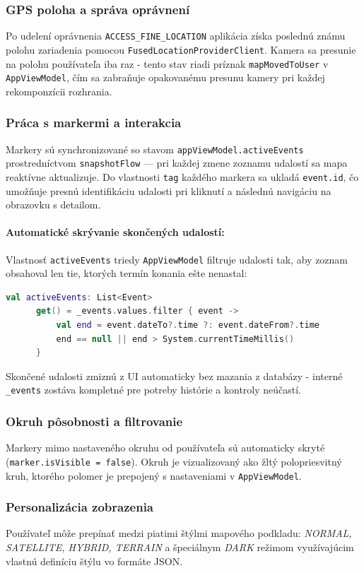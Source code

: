   \subsubsection{GPS poloha a správa oprávnení}
  Po udelení oprávnenia \texttt{ACCESS\_FINE\_LOCATION} aplikácia získa poslednú
  známu polohu zariadenia pomocou \texttt{FusedLocationProviderClient}. Kamera
  sa presunie na polohu používateľa iba raz - tento stav riadi príznak
  \texttt{mapMovedToUser} v \texttt{AppViewModel}, čím sa zabraňuje opakovanému
  presunu kamery pri každej rekomponzícii rozhrania.

  \subsubsection{Práca s markermi a interakcia}
  Markery sú synchronizované so stavom \texttt{appViewModel.activeEvents}
  prostredníctvom \texttt{snapshotFlow} — pri každej zmene zoznamu udalostí
  sa mapa reaktívne aktualizuje. Do vlastnosti \texttt{tag} každého markera
  sa ukladá \texttt{event.id}, čo umožňuje presnú identifikáciu udalosti
  pri kliknutí a následnú navigáciu na obrazovku s detailom.

  \paragraph{Automatické skrývanie skončených udalostí:}
  Vlastnosť \texttt{activeEvents} triedy \texttt{AppViewModel} filtruje udalosti
  tak, aby zoznam obsahoval len tie, ktorých termín konania ešte nenastal:

  \begin{lstlisting}[language=Kotlin, caption=Computed property activeEvents v AppViewModel]
  val activeEvents: List<Event>
      get() = _events.values.filter { event ->
          val end = event.dateTo?.time ?: event.dateFrom?.time
          end == null || end > System.currentTimeMillis()
      }
  \end{lstlisting}

  Skončené udalosti zmiznú z UI
  automaticky bez mazania z databázy - interné \texttt{\_events} zostáva
  kompletné pre potreby histórie a kontroly neúčastí.

  \subsubsection{Okruh pôsobnosti a filtrovanie}
  Markery mimo nastaveného okruhu od používateľa sú automaticky skryté
  (\texttt{marker.isVisible = false}). Okruh je vizualizovaný ako žltý
  polopriesvitný kruh, ktorého polomer je prepojený s nastaveniami
  v \texttt{AppViewModel}.

  \subsubsection{Personalizácia zobrazenia}
  Používateľ môže prepínať medzi piatimi štýlmi mapového podkladu:
  \textit{NORMAL, SATELLITE, HYBRID, TERRAIN} a špeciálnym \textit{DARK}
  režimom využívajúcim vlastnú definíciu štýlu vo formáte JSON.
